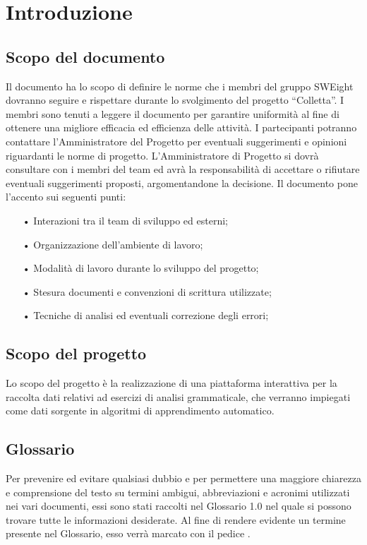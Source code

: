 \section{Introduzione}
\subsection{Scopo del documento}
Il documento ha lo scopo di definire le norme che i membri del gruppo SWEight dovranno seguire e rispettare durante lo svolgimento del progetto “Colletta”. 
I membri sono tenuti a leggere il documento per garantire uniformità al fine di ottenere una migliore efficacia ed efficienza delle attività. I partecipanti potranno contattare l'Amministratore del Progetto per eventuali suggerimenti e opinioni riguardanti le norme di progetto. 
L'Amministratore di Progetto si dovrà consultare con i membri del team ed avrà la responsabilità di accettare o rifiutare eventuali suggerimenti proposti, argomentandone la decisione.
Il documento pone l'accento sui seguenti punti:
\begin{itemize}
\item[•] Interazioni tra il team di sviluppo ed esterni;
\item[•] Organizzazione dell'ambiente di lavoro;
\item[•] Modalità di lavoro durante lo sviluppo del progetto;
\item[•] Stesura documenti e convenzioni di scrittura utilizzate;
\item[•] Tecniche di analisi ed eventuali correzione degli errori;	
\end{itemize}
\subsection{Scopo del progetto}
Lo scopo del progetto è la realizzazione di una piattaforma interattiva per la raccolta dati relativi ad esercizi di analisi grammaticale, che verranno impiegati come dati sorgente in algoritmi di apprendimento automatico. %
\subsection{Glossario}
Per prevenire ed evitare qualsiasi dubbio e per permettere una maggiore chiarezza e comprensione del testo su termini ambigui, abbreviazioni e acronimi utilizzati nei vari documenti, essi sono stati raccolti nel Glossario 1.0 nel quale si possono trovare tutte le informazioni desiderate.
Al fine di rendere evidente un termine presente nel Glossario, esso verrà marcato con il pedice .
